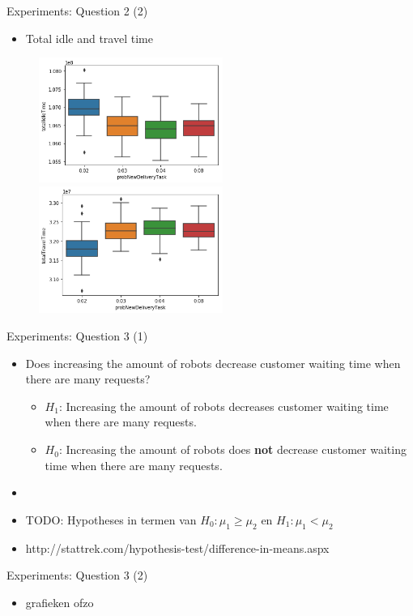 \begin{frame}{Experiments: Question 2 (2)}
    \begin{itemize}
        \item Total idle and travel time
    \end{itemize}

    \begin{figure}[!hbt]
        \begin{adjustbox}{center}
            \includegraphics[width=6cm]{imgs/question2-plot1}
            \includegraphics[width=6cm]{imgs/question2-plot2}
        \end{adjustbox}
    \end{figure}
\end{frame}


\begin{frame}{Experiments: Question 3 (1)}
    \begin{itemize}
        \item Does increasing the amount of robots decrease customer waiting time when there are many requests?
        \begin{itemize}
                \item $H_1$: Increasing the amount of robots decreases customer waiting time when there are many requests.
                \item $H_0$: Increasing the amount of robots does \textbf{not} decrease customer waiting time when there are many requests.
        \end{itemize}

        \item[]
        \item TODO: Hypotheses in termen van $H_0: \mu_1 \geq \mu_2$ en $H_1: \mu_1 < \mu_2$
        \item http://stattrek.com/hypothesis-test/difference-in-means.aspx
    \end{itemize}
\end{frame}



\begin{frame}{Experiments: Question 3 (2)}
    \begin{itemize}
        \item grafieken ofzo
    \end{itemize}
\end{frame}

